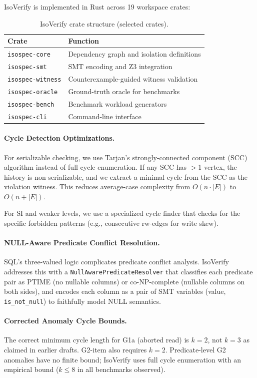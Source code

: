\documentclass[11pt]{article}
\begin{document}
IsoVerify is implemented in Rust across 19 workspace crates:

\begin{table}[t]
\centering
\caption{IsoVerify crate structure (selected crates).}
\begin{tabular}{ll}
\toprule
\textbf{Crate} & \textbf{Function} \\
\midrule
\texttt{isospec-core}     & Dependency graph and isolation definitions \\
\texttt{isospec-smt}      & SMT encoding and Z3 integration \\
\texttt{isospec-witness}  & Counterexample-guided witness validation \\
\texttt{isospec-oracle}   & Ground-truth oracle for benchmarks \\
\texttt{isospec-bench}    & Benchmark workload generators \\
\texttt{isospec-cli}      & Command-line interface \\
\bottomrule
\end{tabular}
\end{table}

\paragraph{Cycle Detection Optimizations.}
For serializable checking, we use Tarjan's strongly-connected component (SCC)
algorithm instead of full cycle enumeration.  If any SCC has $>$1 vertex, the
history is non-serializable, and we extract a minimal cycle from the SCC as
the violation witness.  This reduces average-case complexity from
$O(n \cdot |E|)$ to $O(n + |E|)$.

For SI and weaker levels, we use a specialized cycle finder that checks for
the specific forbidden patterns (e.g., consecutive rw-edges for write skew).

\paragraph{NULL-Aware Predicate Conflict Resolution.}
SQL's three-valued logic complicates predicate conflict analysis.  IsoVerify
addresses this with a \texttt{NullAwarePredicateResolver} that classifies
each predicate pair as PTIME (no nullable columns) or co-NP-complete
(nullable columns on both sides), and encodes each column as a pair of SMT
variables (value, \texttt{is\_not\_null}) to faithfully model NULL semantics.

\paragraph{Corrected Anomaly Cycle Bounds.}
The correct minimum cycle length for G1a (aborted read) is $k=2$, not $k=3$
as claimed in earlier drafts.  G2-item also requires $k=2$.  Predicate-level
G2 anomalies have no finite bound; IsoVerify uses full cycle enumeration with
an empirical bound ($k \leq 8$ in all benchmarks observed).
\end{document}
